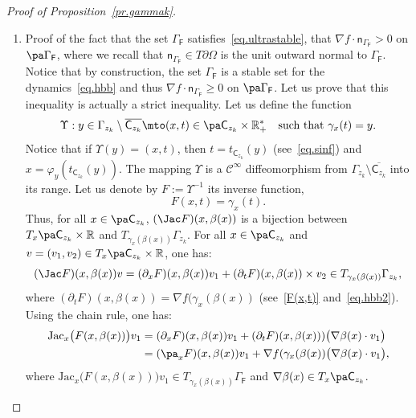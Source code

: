 \begin{proof}[Proof of Proposition~\ref{pr.gammak}]
\begin{enumerate}
\item
Proof of the fact that the set $\Gamma_{\mathsf F}$ satisfies~\eqref{eq.ultrastable}, \ie that
$\nabla f\cdot \mathsf n_{ \Gamma_{\mathsf F} }>0$ on $ \pa \Gamma_{\mathsf F}$,
where we recall that $\mathsf n_{ \Gamma_{\mathsf F}}\in T\partial \Omega$ is the unit outward normal to $ \Gamma_{\mathsf F}$. Notice that by construction, the set $ \Gamma_{\mathsf F}$ is a stable set for the dynamics~\eqref{eq.hbb} and thus $\nabla f\cdot \mathsf n_{ \Gamma_{\mathsf F} }\ge0$ on $ \pa \Gamma_{\mathsf F}$. Let us prove that this inequality is actually a strict inequality. Let us define the function
\[
\Upsilon: y\in \Gamma_{z_k}\setminus \overline{\mathsf C_{z_k}}\mto (x,t)\in \pa \mathsf C_{z_k}\times \mathbb R_+^* \quad\text{such that } \gamma_x(t)=y.
\]
Notice that if $\Upsilon(y)=(x,t)$, then $t=t_{\mathsf C_{z_k}}(y)$
(see~\eqref{eq.sinf}) and $x=\varphi_{y}(t_{\mathsf C_{z_k}}(y))$. The mapping $\Upsilon$ is a $\mathcal C^\infty$ diffeomorphism from $\Gamma_{z_k}\setminus \overline{\mathsf C_{z_k}}$ into its range. Let us denote by $F:=\Upsilon^{-1}$ its inverse function, \ie
\begin{equation}\label{F(x,t)}
F(x,t)=\gamma_x(t).
\end{equation}
Thus, for all $x\in \pa \mathsf C_{z_k}$, $ (\Jac F) (x,\beta(x))$ is a bijection between $T_x\pa \mathsf C_{z_k} \times \mathbb R$ and $ T_{\gamma_x(\beta(x))} \Gamma_{z_k}$. For all $x\in \pa \mathsf C_{z_k}$ and $v = (v_1,v_2)\in T_x\pa \mathsf C_{z_k} \times \mathbb R$, one has:
\begin{equation}\label{jac1}
(\Jac F) (x,\beta(x))v= (\partial_x F)(x,\beta(x)) v_1+ (\partial_t F) (x,\beta(x)) \times v_2 \in T_{\gamma_x(\beta(x))} \Gamma_{z_k},
\end{equation}
where $ (\partial_t F)(x,\beta(x)) = \nabla f(\gamma_x(\beta(x)) $ (see~\eqref{F(x,t)} and~\eqref{eq.hbb2}). Using the chain rule, one has:
\begin{equation}
\label{jac2}
\begin{aligned}
\text{Jac}_x \bigl(F(x,\beta(x))\bigr) v_1&= (\partial_xF)(x,\beta(x)) v_1 + (\partial_t F)(x,\beta(x))) \bigl(\nabla\beta(x) \cdot v_1\bigr)\\
&= (\pa _xF)(x,\beta(x)) v_1 + \nabla f(\gamma_x(\beta(x)) \bigl(\nabla\beta(x) \cdot v_1\bigr),
\end{aligned}
\end{equation}
where $\text{Jac}_x \bigl(F(x,\beta(x))\bigr) v_1\in T_{\gamma_x(\beta(x))} \Gamma_{\mathsf F} $ and $\nabla\beta(x)\in T_x\pa \mathsf C_{z_k}$.

\end{enumerate}
\end{proof}
